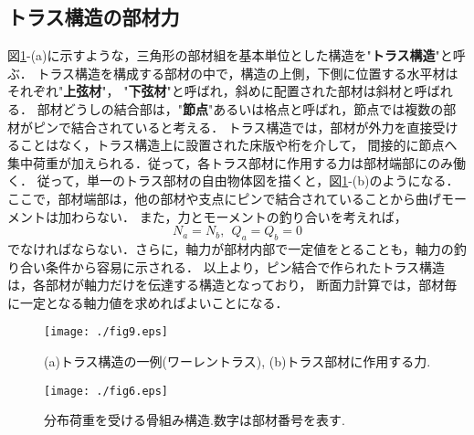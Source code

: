 \documentclass[10pt,a4j]{jbook}
\begin{document}
\subsection{トラス構造の部材力}
図\ref{fig:fig12_9}-(a)に示すような，三角形の部材組を基本単位とした構造を"{\bf トラス構造}"と呼ぶ．
トラス構造を構成する部材の中で，構造の上側，下側に位置する水平材はそれぞれ"{\bf 上弦材}"，
"{\bf 下弦材}"と呼ばれ，斜めに配置された部材は斜材と呼ばれる．
部材どうしの結合部は，"{\bf 節点}"あるいは格点と呼ばれ，節点では複数の部材がピンで結合されていると考える．
トラス構造では，部材が外力を直接受けることはなく，トラス構造上に設置された床版や桁を介して，
間接的に節点へ集中荷重が加えられる．従って，各トラス部材に作用する力は部材端部にのみ働く．
従って，単一のトラス部材の自由物体図を描くと，図\ref{fig:fig12_9}-(b)のようになる．
ここで，部材端部は，他の部材や支点にピンで結合されていることから曲げモーメントは加わらない．
また，力とモーメントの釣り合いを考えれば，
\begin{equation}
	N_a=N_b, \ \ Q_a=Q_b=0
\end{equation}
でなければならない．さらに，軸力が部材内部で一定値をとることも，軸力の釣り合い条件から容易に示される．
以上より，ピン結合で作られたトラス構造は，各部材が軸力だけを伝達する構造となっており，
断面力計算では，部材毎に一定となる軸力値を求めればよいことになる．
\begin{figure}[h]
	\begin{center}
	\texttt{[image: ./fig9.eps]} 
	\end{center}
	\caption{
		(a)トラス構造の一例(ワーレントラス), (b)トラス部材に作用する力. 
	} 
	\label{fig:fig12_9}
\end{figure}
\begin{figure}[h]
	\begin{center}
	\texttt{[image: ./fig6.eps]} 
	\end{center}
	\caption{
		分布荷重を受ける骨組み構造.数字は部材番号を表す.
	} 
	\label{fig:fig12_6}
\end{figure}
\end{document}
